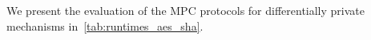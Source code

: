 

We present the evaluation of the MPC protocols for differentially private mechanisms in~\autoref{tab:runtimes_aes_sha}.

